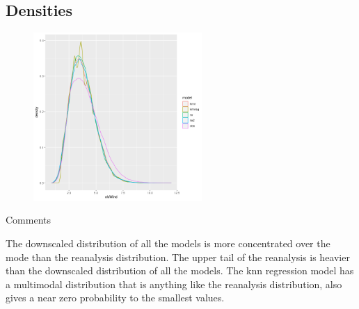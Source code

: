 \documentclass[xcolor=dvipsnames]{beamer}
\begin{document}
    \subsection{Densities}
    \begin{frame}{}
        \begin{figure}
            \centering
                 \includegraphics[width=0.57\textwidth]{images/densities.png}
       \end{figure}
    \end{frame}
    \begin{frame}{Comments}
        \begin{outline}
            \1 The downscaled distribution of all the models is more concentrated over the mode than the reanalysis distribution.
            \1 The upper tail of the reanalysis is heavier than the downscaled distribution of all the models.
            \1 The knn regression model has a multimodal distribution that is anything like the reanalysis distribution, also gives a near zero probability to the smallest values.
        \end{outline}
    \end{frame}
\end{document}
